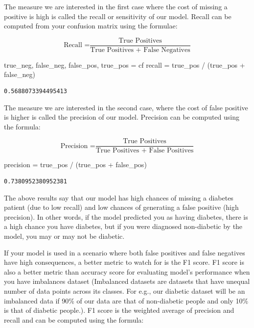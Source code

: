 \documentclass[
  letterpaper,
]{book}
\newenvironment{Shaded}{\begin{snugshade}}{\end{snugshade}}
\newcommand{\NormalTok}[1]{\textcolor[rgb]{0.00,0.23,0.31}{#1}}
\newcommand{\OperatorTok}[1]{\textcolor[rgb]{0.37,0.37,0.37}{#1}}
\begin{document}
The measure we are interested in the first case where the cost of
missing a positive is high is called the recall or sensitivity of our
model. Recall can be computed from your confusion matrix using the
formulae:

\[ \text{Recall =} \frac{\text{True Positives}}{\text{True Positives + False Negatives}}\]

\begin{Shaded}
\begin{Highlighting}[]
\NormalTok{true\_neg, false\_neg, false\_pos, true\_pos }\OperatorTok{=}\NormalTok{ cf}
\NormalTok{recall }\OperatorTok{=}\NormalTok{ true\_pos }\OperatorTok{/}\NormalTok{ (true\_pos }\OperatorTok{+}\NormalTok{ false\_neg)}
\end{Highlighting}
\end{Shaded}

\begin{verbatim}
0.5688073394495413
\end{verbatim}

The measure we are interested in the second case, where the cost of
false positive is higher is called the precision of our model. Precision
can be computed using the formula:

\[\text{Precision =} \frac{\text{True Positives}}{\text{True Positives + False Positives}}\]

\begin{Shaded}
\begin{Highlighting}[]
\NormalTok{precision }\OperatorTok{=}\NormalTok{ true\_pos }\OperatorTok{/}\NormalTok{ (true\_pos }\OperatorTok{+}\NormalTok{ false\_pos)}
\end{Highlighting}
\end{Shaded}

\begin{verbatim}
0.7380952380952381
\end{verbatim}

The above results say that our model has high chances of missing a
diabetes patient (due to low recall) and low chances of generating a
false positive (high precision). In other words, if the model predicted
you as having diabetes, there is a high chance you have diabetes, but if
you were diagnosed non-diabetic by the model, you may or may not be
diabetic.

If your model is used in a scenario where both false positives and false
negatives have high consequences, a better metric to watch for is the F1
score. F1 score is also a better metric than accuracy score for
evaluating model's performance when you have imbalances dataset
(Imbalanced datasets are datasets that have unequal number of data
points across its classes. For e.g., our diabetic dataset will be an
imbalanced data if 90\% of our data are that of non-diabetic people and
only 10\% is that of diabetic people.). F1 score is the weighted average
of precision and recall and can be computed using the formula:
\end{document}
